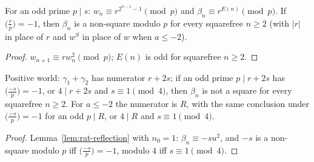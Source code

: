 \begin{lemma}[primes of $s$]
  \label{lem:rat-ps}
  \leanok
  For an odd prime $p \mid s$: $w_n \equiv r^{2^{n-1}-1} \pmod p$ and $\beta_n \equiv r^{E(n)}
  \pmod p$. If $\bigl(\tfrac{r}{p}\bigr) = -1$, then $\beta_n$ is a non-square modulo $p$ for every
  squarefree $n \ge 2$ (with $|r|$ in place of $r$ and $w^S$ in place of $w$ when $a \le -2$).
\end{lemma}
\begin{proof}
  \leanok
  $w_{n+1} \equiv r w_n^2 \pmod p$; $E(n)$ is odd for squarefree $n \ge 2$.
\end{proof}

\begin{lemma}[reflection at $n_0 = 1$]
  \label{lem:rat-refl1}
  \leanok
  Positive world: $\gamma_1 + \gamma_2$ has numerator $r + 2s$; if an odd prime $p \mid r + 2s$ has
  $\bigl(\tfrac{-s}{p}\bigr) = -1$, or $4 \mid r + 2s$ and $s \equiv 1 \pmod 4$, then $\beta_n$ is
  not a square for every squarefree $n \ge 2$. For $a \le -2$ the numerator is $R$, with the same
  conclusion under $\bigl(\tfrac{-s}{p}\bigr) = -1$ for an odd $p \mid R$, or $4 \mid R$ and
  $s \equiv 1 \pmod 4$.
\end{lemma}
\begin{proof}
  \leanok
  Lemma~\ref{lem:rat-reflection} with $n_0 = 1$: $\beta_n \equiv -s u^2$, and $-s$ is a non-square
  modulo $p$ iff $\bigl(\tfrac{-s}{p}\bigr) = -1$, modulo $4$ iff $s \equiv 1 \pmod 4$.
\end{proof}


